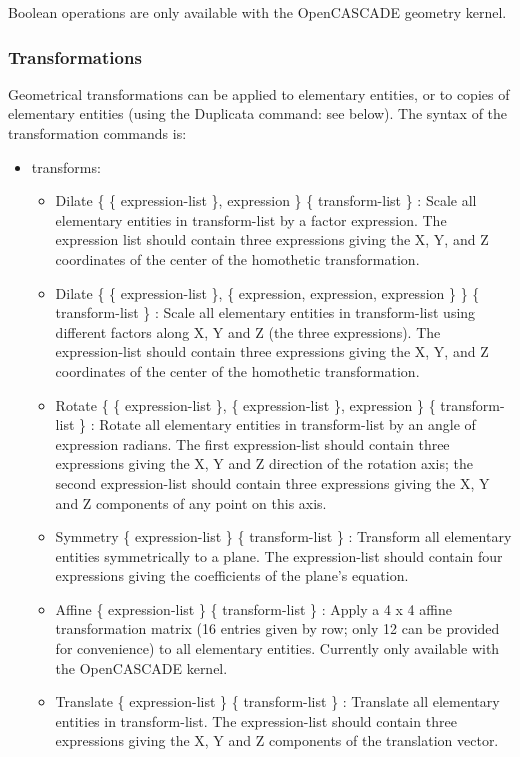 \documentclass[dvipdfmx, 9pt, a4paper]{article}
\numberwithin{equation}{section}
\begin{document}
Boolean operations are only available with the OpenCASCADE geometry kernel.

\subsubsection{Transformations}
Geometrical transformations can be applied to elementary entities, or to copies of elementary entities (using the Duplicata command: see below). The syntax of the transformation commands is:\\
\begin{itemize}
\item transforms:
\begin{itemize}
\item Dilate \{ \{ expression-list \}, expression \} \{ transform-list \} : Scale all elementary entities in transform-list by a factor expression. The expression list should contain three expressions giving the X, Y, and Z coordinates of the center of the homothetic transformation.
\item Dilate \{ \{ expression-list \}, \{ expression, expression, expression \} \} \{ transform-list \} : Scale all elementary entities in transform-list using different factors along X, Y and Z (the three expressions). The expression-list should contain three expressions giving
the X, Y, and Z coordinates of the center of the homothetic transformation.
\item Rotate \{ \{ expression-list \}, \{ expression-list \}, expression \} \{ transform-list \} : Rotate all elementary entities in transform-list by an angle of expression radians. The first expression-list should contain three expressions giving the X, Y and Z direction of the rotation axis; the second expression-list should contain three expressions giving the X, Y and Z components of any point on this axis.
\item Symmetry \{ expression-list \} \{ transform-list \} : Transform all elementary entities symmetrically to a plane. The expression-list
should contain four expressions giving the coefficients of the plane's equation.
\item Affine \{ expression-list \} \{ transform-list \} : Apply a 4 x 4 affine transformation matrix (16 entries given by row; only 12 can be
provided for convenience) to all elementary entities. Currently only available with the OpenCASCADE kernel.
\item Translate \{ expression-list \} \{ transform-list \} : Translate all elementary entities in transform-list. The expression-list should contain three expressions giving the X, Y and Z components of the translation vector.

\end{itemize}
\end{itemize}
\end{document}
